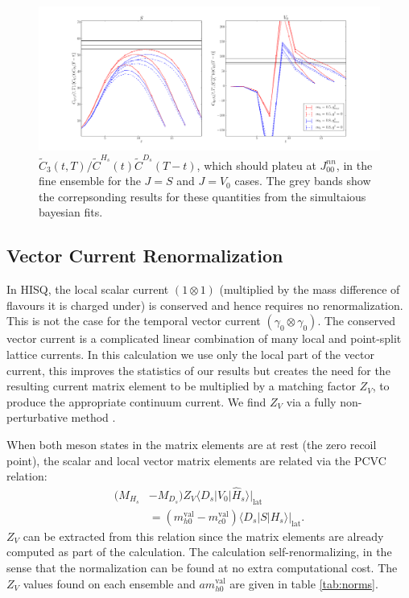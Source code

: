 \begin{figure}[htb!]
    \hspace{-60pt}
    \includegraphics[width=1.3\textwidth]{images/BsDs/fine_3pt_summary.pdf}
    \caption{$\tilde{C}_3(t,T)/\tilde{C}^{H_s}(t) \tilde{C}^{D_s}(T-t)$, which should plateu at $J_{00}^{nn}$, in the fine ensemble for the $J=S$ and $J=V_0$ cases. The grey bands show the correpsonding results for these quantities from the simultaious bayesian fits.\label{fig:3ptcorrs_BsDs}}
\end{figure}

\subsection{Vector Current Renormalization}

In HISQ, the local scalar current $(1\otimes 1)$ (multiplied by the mass difference of flavours it is charged under) is conserved and hence requires no renormalization. This is not the case for the temporal vector current $(\gamma_0\otimes \gamma_0)$. The conserved vector current is a complicated linear combination of many local and point-split lattice currents. In this calculation we use only the local part of the vector current, this improves the statistics of our results but creates the need for the resulting current matrix element to be multiplied by a matching factor $Z_V$, to produce the appropriate continuum current. We find $Z_V$ via a fully non-perturbative method \cite{McNeile:2011ng,Donald:2013pea}.

When both meson states in the matrix elements are at rest (the zero recoil point), the scalar and local vector matrix elements are related via the PCVC relation:
\begin{align}
  ( M_{H_s}& - M_{D_s} ) Z_V \langle D_s | V_0 | \hat{H}_s \rangle|_{\text{lat}} \nonumber \\ &= (m^{\text{val}}_{h0} - m^{\text{val}}_{c0}) \langle D_s | S | H_s \rangle|_{\text{lat}}.
  \label{eq:ward}
\end{align}
$Z_V$ can be extracted from this relation since the matrix elements are already computed as part of the calculation. The calculation self-renormalizing, in the sense that the normalization can be found at no extra computational cost. The $Z_V$ values found on each ensemble and $am^{\text{val}}_{h0}$ are given in table \ref{tab:norms}.

